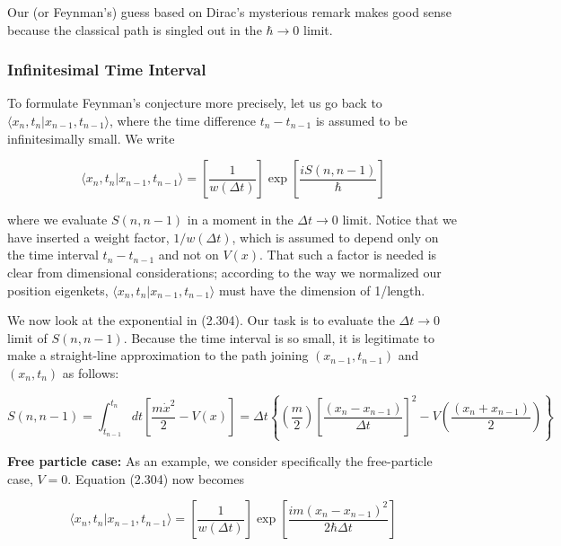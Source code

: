 \documentclass[11pt,a4paper]{article}
\begin{document}
Our (or Feynman's) guess based on Dirac's mysterious remark makes good sense because the classical path is singled out in the $\hbar \to 0$ limit.

\subsubsection{Infinitesimal Time Interval}

To formulate Feynman's conjecture more precisely, let us go back to $\langle x_n, t_n|x_{n-1}, t_{n-1}\rangle$, where the time difference $t_n - t_{n-1}$ is assumed to be infinitesimally small. We write

\begin{equation}
\langle x_n, t_n|x_{n-1}, t_{n-1}\rangle = \left[\frac{1}{w(\Delta t)}\right]\exp\left[\frac{iS(n, n-1)}{\hbar}\right]
\tag{2.304}
\end{equation}

where we evaluate $S(n, n-1)$ in a moment in the $\Delta t \to 0$ limit. Notice that we have inserted a weight factor, $1/w(\Delta t)$, which is assumed to depend only on the time interval $t_n - t_{n-1}$ and not on $V(x)$. That such a factor is needed is clear from dimensional considerations; according to the way we normalized our position eigenkets, $\langle x_n, t_n|x_{n-1}, t_{n-1}\rangle$ must have the dimension of 1/length.

We now look at the exponential in (2.304). Our task is to evaluate the $\Delta t \to 0$ limit of $S(n, n-1)$. Because the time interval is so small, it is legitimate to make a straight-line approximation to the path joining $(x_{n-1}, t_{n-1})$ and $(x_n, t_n)$ as follows:

\begin{equation}
S(n, n-1) = \int_{t_{n-1}}^{t_n} dt\left[\frac{m\dot{x}^2}{2} - V(x)\right] = \Delta t\left\{\left(\frac{m}{2}\right)\left[\frac{(x_n - x_{n-1})}{\Delta t}\right]^2 - V\left(\frac{(x_n + x_{n-1})}{2}\right)\right\}
\tag{2.305}
\end{equation}

\textbf{Free particle case:}
As an example, we consider specifically the free-particle case, $V = 0$. Equation (2.304) now becomes

\begin{equation}
\langle x_n, t_n|x_{n-1}, t_{n-1}\rangle = \left[\frac{1}{w(\Delta t)}\right]\exp\left[\frac{im(x_n - x_{n-1})^2}{2\hbar\Delta t}\right]
\tag{2.306}
\end{equation}
\end{document}
